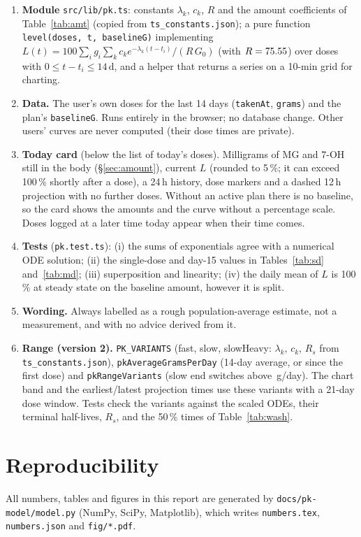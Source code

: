 \documentclass[10pt,a4paper]{article}
\begin{document}
\begin{enumerate}
\item \textbf{Module} \texttt{src/lib/pk.ts}: constants $\lambda_k$, $c_k$, $R$ and the amount coefficients of
Table~\ref{tab:amt} (copied from \texttt{ts\_constants.json}); a pure function \texttt{level(doses, t, baselineG)} implementing $L(t)=100\sum_i g_i\sum_k c_k e^{-\lambda_k(t-t_i)}/(R\,G_0)$ (with $R=75.55$) over doses with
$0\le t-t_i\le 14$\,d, and a helper that returns a series on a 10-min grid for charting.
\item \textbf{Data.} The user's own doses for the last 14 days (\texttt{takenAt}, \texttt{grams}) and the plan's \texttt{baselineG}.
Runs entirely in the browser; no database change. Other users' curves are never computed (their dose times are private).
\item \textbf{Today card} (below the list of today's doses). Milligrams of MG and 7-OH still in the body (\S\ref{sec:amount}),
current $L$ (rounded to 5\,\%; it can exceed 100\,\% shortly after a dose), a 24\,h history, dose markers and a dashed 12\,h
projection with no further doses. Without an active plan there is no baseline, so the card shows the amounts and the curve
without a percentage scale. Doses logged at a later time today appear when their time comes.
\item \textbf{Tests} (\texttt{pk.test.ts}): (i) the sums of exponentials agree with a numerical ODE solution; (ii) the single-dose and
day-15 values in Tables~\ref{tab:sd} and~\ref{tab:md}; (iii) superposition and linearity; (iv) the daily mean of $L$ is 100\,\% at steady state on the baseline amount, however it is split.
\item \textbf{Wording.} Always labelled as a rough population-average estimate, not a measurement, and with no advice derived from it.
\item \textbf{Range (version 2).} \texttt{PK\_VARIANTS} (fast, slow, slowHeavy: $\lambda_k$, $c_k$, $R_s$ from \texttt{ts\_constants.json}),
\texttt{pkAverageGramsPerDay} (14-day average, or since the first dose) and \texttt{pkRangeVariants} (slow end switches above \nheavyg\,g/day).
The chart band and the earliest/latest projection times use these variants with a 21-day dose window. Tests check the variants against the
scaled ODEs, their terminal half-lives, $R_s$, and the 50\,\% times of Table~\ref{tab:wash}.
\end{enumerate}

\section*{Reproducibility}
All numbers, tables and figures in this report are generated by \texttt{docs/pk-model/model.py} (NumPy, SciPy, Matplotlib),
which writes \texttt{numbers.tex}, \texttt{numbers.json} and \texttt{fig/*.pdf}.
\end{document}
